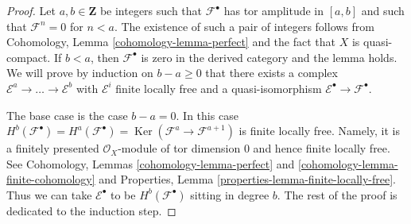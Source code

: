 \documentclass{stacks-project}
\theoremstyle{plain}
\theoremstyle{definition}
\theoremstyle{remark}
\numberwithin{equation}{subsection}
\def\Ker{\mathop{\mathrm{Ker}}}
\begin{document}
\begin{proof}
Let $a, b \in \mathbf{Z}$ be integers such that $\mathcal{F}^\bullet$
has tor amplitude in $[a, b]$ and such that $\mathcal{F}^n = 0$ for
$n < a$. The existence of such a pair of integers
follows from Cohomology, Lemma \ref{cohomology-lemma-perfect}
and the fact that $X$ is quasi-compact.
If $b < a$, then $\mathcal{F}^\bullet$ is zero in the
derived category and the lemma holds.
We will prove by induction on
$b - a \geq 0$ that there exists a complex
$\mathcal{E}^a \to \ldots \to \mathcal{E}^b$
with $\mathcal{E}^i$ finite locally free
and a quasi-isomorphism $\mathcal{E}^\bullet \to \mathcal{F}^\bullet$.

\medskip\noindent
The base case is the case $b - a = 0$. In this case
$H^b(\mathcal{F}^\bullet) = H^a(\mathcal{F}^\bullet) =
\Ker(\mathcal{F}^a \to \mathcal{F}^{a + 1})$
is finite locally free. Namely, it is a finitely presented
$\mathcal{O}_X$-module of tor dimension $0$ and hence finite
locally free. See Cohomology, Lemmas \ref{cohomology-lemma-perfect} and
\ref{cohomology-lemma-finite-cohomology} and
Properties, Lemma \ref{properties-lemma-finite-locally-free}.
Thus we can take $\mathcal{E}^\bullet$ to be
$H^b(\mathcal{F}^\bullet)$ sitting in degree $b$.
The rest of the proof is dedicated to the induction step.


\end{proof}
\end{document}
